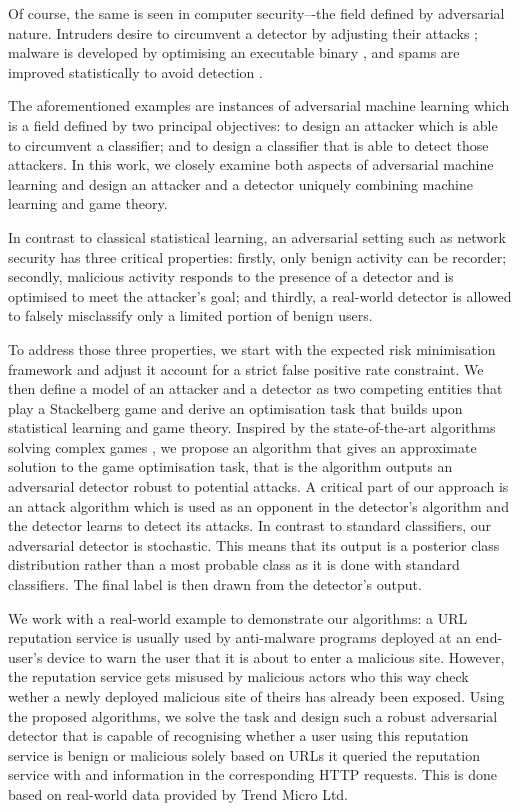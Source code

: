Of course, the same is seen in computer security–-the field defined by
adversarial nature. Intruders desire to circumvent a detector by
adjusting their attacks \cite{adversarial_malware}; malware is developed by
optimising an executable binary \cite{adversarial_malware_pe}, and spams are improved statistically to avoid detection \cite{good_word_attacks}.

The aforementioned examples are instances of adversarial machine learning which is a field defined by two principal objectives: to design an attacker which is able to circumvent a classifier; and to design a classifier that is able to detect those attackers. In this work, we closely examine both aspects of adversarial machine learning and design an attacker and a detector uniquely combining machine learning and game theory.

In contrast to classical statistical learning, an adversarial setting such as network security has three critical properties: firstly, only benign activity can be recorder; secondly, malicious activity responds to the presence of a detector and is optimised to meet the attacker's goal; and thirdly, a real-world detector is allowed to falsely misclassify only a limited portion of benign users.

To address those three properties, we start with the expected risk minimisation framework \cite{vapnik} and adjust it account for a strict false positive rate constraint. We then define a model of an attacker and a detector as two competing entities that play a Stackelberg game \cite{stackelberg_games} and derive an optimisation task that builds upon statistical learning and game theory. Inspired by the state-of-the-art algorithms solving complex games \cite{stackgrad, exploitability_descent}, we propose an algorithm that gives an approximate solution to the game optimisation task, that is the algorithm outputs an adversarial detector robust to potential attacks. A critical part of our approach is an attack algorithm which is used as an opponent in the detector's algorithm and the detector learns to detect its attacks. In contrast to standard classifiers, our adversarial detector is stochastic. This means that its output is a posterior class distribution rather than a most probable class as it is done with standard classifiers. The final label is then drawn from the detector's output.

We work with a real-world example to demonstrate our algorithms: a URL reputation service is usually used by anti-malware programs deployed at an end-user's device to warn the user that it is about to enter a malicious site. However, the reputation service gets misused by malicious actors who this way check wether a newly deployed malicious site of theirs has already been exposed. Using the proposed algorithms, we solve the task and design such a robust adversarial detector that is capable of recognising whether a user using this reputation service is benign or malicious solely based on URLs it queried the reputation service with and information in the corresponding HTTP requests. This is done based on real-world data provided by Trend Micro Ltd.

